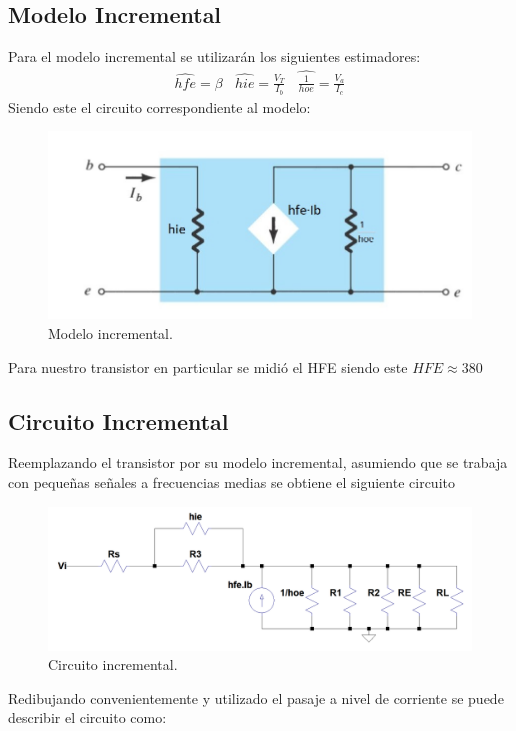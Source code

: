 \documentclass[a4paper]{article}
\begin{document}
\subsection{Modelo Incremental}
Para el modelo incremental se utilizarán los siguientes estimadores:
\begin{align}\hat{hfe}=\beta \ \ \ \  \hat{hie} = \frac{V_T}{I_b} \ \ \ \ \hat{\frac{1}{hoe}} = \frac{V_a}{I_c}\end{align}
Siendo este el circuito correspondiente al modelo:
\begin{figure} [H]
	\centering
	\includegraphics[width=\textwidth]{imagenes/modeloincremetnal.jpg}
	\caption{Modelo incremental.}
	\label{fig:modinc}
\end{figure}
Para nuestro transistor en particular se midió el HFE siendo este $HFE \approx 380 $
\subsection{Circuito Incremental}
Reemplazando el transistor por su modelo incremental, asumiendo que se trabaja con pequeñas señales a frecuencias medias se obtiene el siguiente circuito
\begin{figure} [H]
	\centering
	\includegraphics[width=\textwidth]{imagenes/circinc.png}
	\caption{Circuito incremental.}
	\label{fig:circinc}
\end{figure}
Redibujando convenientemente y utilizado el pasaje a nivel de corriente se puede describir el circuito como:
\end{document}
